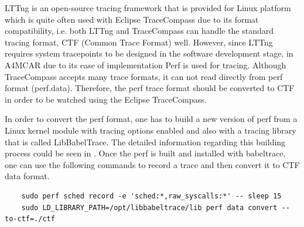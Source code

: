 \begin{itemize}
	LTTng \cite{lttng} is an open-source tracing framework that is provided for Linux platform which is quite often used with Eclipse TraceCompass due to its format compatibility, i.e. both LTTng and TraceCompass can handle the standard tracing format, CTF (Common Trace Format) well. However, since LTTng requires system tracepoints to be designed in the software development stage, in A4MCAR due to its ease of implementation Perf is used for tracing. Although TraceCompass accepts many trace formats, it can not read directly from perf format (perf.data). Therefore, the perf trace format should be converted to CTF in order to be watched using the Eclipse TraceCompass.
	
	In order to convert the perf format, one has to build a new version of perf from a Linux kernel module \cite{jolsa} with tracing options enabled and also with a tracing library that is called LibBabelTrace. The detailed information regarding this building process could be seen in \cite{perfbabeltrace}. Once the perf is built and installed with babeltrace, one can use the following commands to record a trace and then convert it to CTF data format. 
	\begin{lstlisting}
	sudo perf sched record -e 'sched:*,raw_syscalls:*' -- sleep 15
	sudo LD_LIBRARY_PATH=/opt/libbabeltrace/lib perf data convert --to-ctf=./ctf
	\end{lstlisting}
	

\end{itemize}
